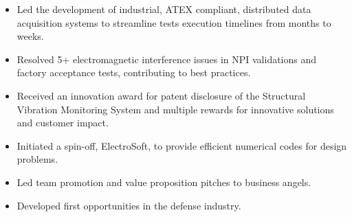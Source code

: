 \documentclass[9pt,a4paper,ragged2e,withhyper]{altacv} %
\begin{document}
\begin{paracol}{2}
\begin{itemize}
\item Led the development of industrial, ATEX compliant, distributed data acquisition
systems to streamline tests execution timelines from months to weeks.
\item Resolved 5+ electromagnetic interference issues in NPI validations and factory
acceptance tests, contributing to best practices.
\item Received an innovation award for patent disclosure of the Structural Vibration
Monitoring System and multiple rewards for innovative solutions and customer impact.
\end{itemize}
\divider

\begin{itemize}
\item Initiated a spin-off, ElectroSoft, to provide efficient numerical codes for design problems.
\item Led team promotion and value proposition pitches to business angels.
\item Developed first opportunities in the defense industry.
\end{itemize}
\divider


\end{paracol}
\end{document}
